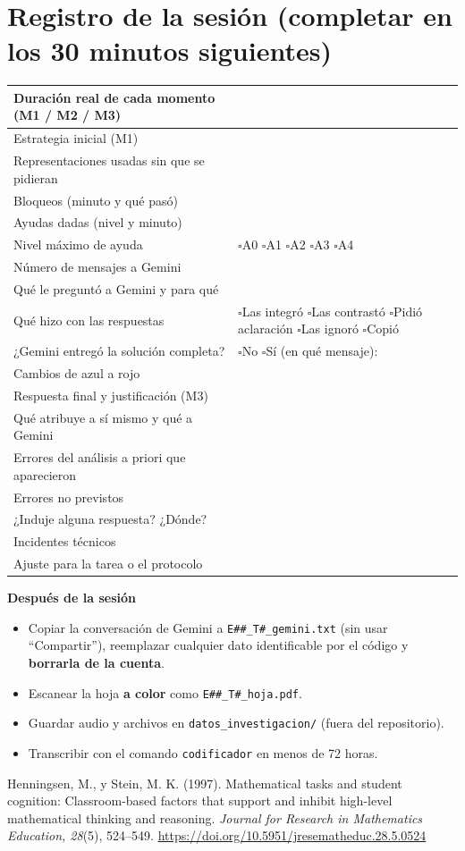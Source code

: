 \documentclass[10pt,letterpaper]{article}
\newcommand{\cas}{$\square$\;}
\begin{document}
\section*{Registro de la sesión \small(completar en los 30 minutos siguientes)}
\renewcommand{\arraystretch}{1.5}
\begin{tabularx}{\linewidth}{|p{5.4cm}|X|}
\hline
Duración real de cada momento (M1 / M2 / M3) & \\ \hline
Estrategia inicial (M1) & \\[0.8cm] \hline
Representaciones usadas sin que se pidieran & \\ \hline
Bloqueos (minuto y qué pasó) & \\[0.8cm] \hline
Ayudas dadas (nivel y minuto) & \\ \hline
Nivel máximo de ayuda & \cas A0 \quad \cas A1 \quad \cas A2 \quad \cas A3 \quad \cas A4 \\ \hline
Número de mensajes a Gemini & \\ \hline
Qué le preguntó a Gemini y para qué & \\[0.8cm] \hline
Qué hizo con las respuestas & \cas Las integró \quad \cas Las contrastó \quad \cas Pidió aclaración \quad \cas Las ignoró \quad \cas Copió \\ \hline
¿Gemini entregó la solución completa? & \cas No \quad \cas Sí (en qué mensaje): \\ \hline
Cambios de azul a rojo & \\[0.8cm] \hline
Respuesta final y justificación (M3) & \\[0.8cm] \hline
Qué atribuye a sí mismo y qué a Gemini & \\[0.8cm] \hline
Errores del análisis a priori que aparecieron & \\ \hline
Errores no previstos & \\ \hline
¿Induje alguna respuesta? ¿Dónde? & \\ \hline
Incidentes técnicos & \\ \hline
Ajuste para la tarea o el protocolo & \\[0.8cm] \hline
\end{tabularx}

\bigskip
\textbf{Después de la sesión}
\begin{itemize}
  \item[\cas] Copiar la conversación de Gemini a \texttt{E\#\#\_T\#\_gemini.txt} (sin usar ``Compartir''), reemplazar cualquier dato identificable por el código y \textbf{borrarla de la cuenta}.
  \item[\cas] Escanear la hoja \textbf{a color} como \texttt{E\#\#\_T\#\_hoja.pdf}.
  \item[\cas] Guardar audio y archivos en \texttt{datos\_investigacion/} (fuera del repositorio).
  \item[\cas] Transcribir con el comando \texttt{codificador} en menos de 72 horas.
\end{itemize}

\medskip
{\footnotesize Henningsen, M., y Stein, M. K. (1997). Mathematical tasks and student cognition: Classroom-based factors that support and inhibit high-level mathematical thinking and reasoning. \emph{Journal for Research in Mathematics Education, 28}(5), 524--549. \url{https://doi.org/10.5951/jresematheduc.28.5.0524}}
\end{document}

